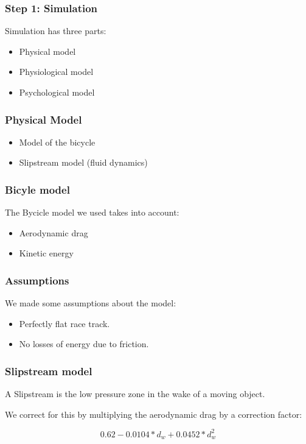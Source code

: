 \documentclass{beamer}
\begin{document}
\begin{frame}
\frametitle{Step 1: Simulation}
Simulation has three parts: \\
\pause
\vspace{0.7cm}
\begin{itemize}
\item Physical model
\pause
\vspace{0.7cm}
\item Physiological model
\pause
\vspace{0.7cm}
\item Psychological model
\end{itemize}
\end{frame}

\begin{frame}
\frametitle{Physical Model}

\begin{itemize}
\item Model of the bicycle
\item Slipstream model (fluid dynamics)
\end{itemize}

\end{frame}

\begin{frame}
\frametitle{Bicyle model}
The Bycicle model we used takes into account:
\begin{itemize}
\vspace{0.7cm}
\pause
\item Aerodynamic drag
\vspace{0.7cm}
\pause
\item Kinetic energy
\end{itemize}
\pause
\vspace{0.7cm}

\end{frame}

\begin{frame}
\frametitle{Assumptions}
We made some assumptions about the model:
\vspace{0.7cm}
\pause
\begin{itemize}
\item Perfectly flat race track.
\pause
\vspace{0.7cm}
\item No losses of energy due to friction.
\pause
\vspace{0.7cm}
\end{itemize}
\end{frame}

\begin{frame}
\frametitle{Slipstream model}
A Slipstream is the low pressure zone in the wake of a moving object. \newline \par
\pause
We correct for this by multiplying the aerodynamic drag by a correction factor:

$$ 0.62 - 0.0104*d_w + 0.0452*d_w^2 $$

\end{frame}
\end{document}
